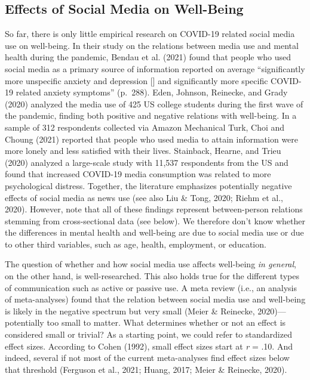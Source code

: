 \documentclass[
  english,
  man,mask,floatsintext]{apa6}
\begin{document}
\hypertarget{effects-of-social-media-on-well-being}{%
\subsection{Effects of Social Media on Well-Being}\label{effects-of-social-media-on-well-being}}

So far, there is only little empirical research on COVID-19 related social media use on well-being.
In their study on the relations between media use and mental health during the pandemic, Bendau et al. (2021) found that people who used social media as a primary source of information reported on average ``significantly more unspecific anxiety and depression {[}{]} and significantly more specific COVID-19 related anxiety symptoms'' (p.~288).
Eden, Johnson, Reinecke, and Grady (2020) analyzed the media use of 425 US college students during the first wave of the pandemic, finding both positive and negative relations with well-being.
In a sample of 312 respondents collected via Amazon Mechanical Turk, Choi and Choung (2021) reported that people who used media to attain information were more lonely and less satisfied with their lives.
Stainback, Hearne, and Trieu (2020) analyzed a large-scale study with 11,537 respondents from the US and found that increased COVID-19 media consumption was related to more psychological distress.
Together, the literature emphasizes potentially negative effects of social media as news use (see also Liu \& Tong, 2020; Riehm et al., 2020).
However, note that all of these findings represent between-person relations stemming from cross-sectional data (see below).
We therefore don't know whether the differences in mental health and well-being are due to social media use or due to other third variables, such as age, health, employment, or education.

The question of whether and how social media use affects well-being \emph{in general}, on the other hand, is well-researched.
This also holds true for the different types of communication such as active or passive use.
A meta review (i.e., an analysis of meta-analyses) found that the relation between social media use and well-being is likely in the negative spectrum but very small (Meier \& Reinecke, 2020)---potentially too small to matter.
What determines whether or not an effect is considered small or trivial?
As a starting point, we could refer to standardized effect sizes.
According to Cohen (1992), small effect sizes start at \emph{r} = .10.
And indeed, several if not most of the current meta-analyses find effect sizes below that threshold (Ferguson et al., 2021; Huang, 2017; Meier \& Reinecke, 2020).
\end{document}
